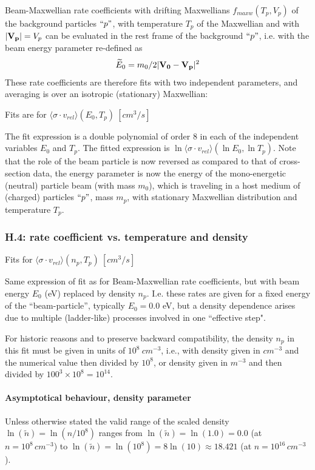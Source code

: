 \documentclass[12pt,dvipdfmx]{article}
\begin{document}
Beam-Maxwellian rate coefficients with drifting Maxwellians $f_{maxw}(T_p,V_p)$ of the background particles $``p"$, with temperature $T_p$ of the
Maxwellian and with $|{\bf V_p}|= V_p$ can be evaluated in the
rest frame of the background $``p"$, i.e. with the beam energy parameter re-defined as
\begin{equation}\label{E0rest}
\widetilde{E}_0=m_0/2|{\bf V_0}-{\bf V_p}|^2
\end{equation}
These rate coefficients are
therefore fits with two independent parameters, and averaging is over an isotropic (stationary) Maxwellian:

Fits are for $\langle\sigma \cdot v_{rel}  \rangle (E_0,T_p) \ [cm^3/s]$

The fit expression is a double polynomial of order 8  in each of the independent variables
$E_0$ and $T_p$. The fitted expression is $\ln\langle\sigma \cdot v_{rel}  \rangle (\ln{E_0},\ln{T_p})$.
Note that the role of the beam particle is now reversed as compared to that of cross-section data,
the energy parameter is now the energy of the mono-energetic (neutral) particle beam (with mass $m_0$), which is traveling in a host medium
of (charged) particles $``p"$, mass $m_p$, with stationary Maxwellian distribution and temperature $T_p$.



\subsubsection{H.4: rate coefficient vs. temperature and density}\label{sec1.3.4}
Fits for $\langle\sigma \cdot v_{rel}  \rangle (n_p,T_p) \ [cm^3/s]$

Same expression of fit as for Beam-Maxwellian rate coefficients, but with beam energy
$E_0$ (eV) replaced by density $n_p$.
I.e. these rates are given for a fixed energy of the ``beam-particle'', typically $E_0=0.0$ eV,
but a density dependence arises due to multiple (ladder-like) processes involved in one ``effective step".

For historic reasons and to
preserve backward compatibility, the density $n_p$ in this fit must be
given in units of $10^8 \ cm^{-3}$, i.e., with density given in $cm^{-3}$ and
the numerical value then divided by $10^8$, or density given in $m^{-3}$ and then
divided by $100^3 \times 10^8 = 10^{14}$.

\paragraph{Asymptotical behaviour, density parameter}
Unless otherwise stated the valid range of the scaled density $\ln(\tilde n) = \ln (n/10^8)$ ranges from $\ln(\tilde n) = \ln(1.0) = 0.0$  (at $n=10^8 \, cm^{-3}$)
to $\ln(\tilde n) = \ln(10^8) = 8 \ln(10) \approx 18.421$  (at $n=10^{16} \, cm^{-3}$).
\end{document}
